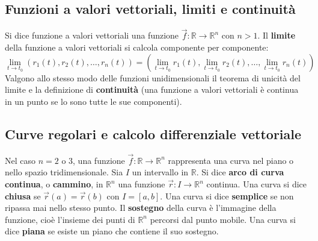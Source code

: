 \subsection{Funzioni a valori vettoriali, limiti e continuità}
Si dice funzione a valori vettoriali una funzione $\vec{f} : \mathbb{R} \rightarrow  \mathbb{R}^n$ con $n > 1$.\newline
\newline
Il \textbf{limite} della funzione a valori vettoriali si calcola componente per componente:
\[
    \lim_{t\rightarrow t_0}(r_1(t), r_2(t), \dots, r_n(t)) = \left(\lim_{t\rightarrow t_0}r_1(t), \lim_{t\rightarrow t_0}r_2(t), \dots, \lim_{t\rightarrow t_0}r_n(t)\right)
\]
Valgono allo stesso modo delle funzioni unidimensionali il teorema di unicità del limite e la definizione di \textbf{continuità} (una funzione a valori vettoriali è continua in un punto se lo sono tutte le sue componenti).\newline
\subsection{Curve regolari e calcolo differenziale vettoriale}
Nel caso $n = 2$ o $3$, una funzione $\vec{f} : \mathbb{R} \rightarrow  \mathbb{R}^n$ rappresenta una curva nel piano o nello spazio tridimensionale.\newline
\newline
Sia $I$ un intervallo in $\mathbb{R}$. Si dice \textbf{arco di curva continua}, o \textbf{cammino}, in $\mathbb{R}^n$ una funzione $\vec{r}: I \rightarrow \mathbb{R}^n$ continua.\newline
\newline
Una curva si dice \textbf{chiusa} se $\vec{r}(a) = \vec{r}(b)$ con $I=[a,b]$.\newline
\newline
Una curva si dice \textbf{semplice} se non ripassa mai nello stesso punto.\newline
\newline
Il \textbf{sostegno} della curva è l'immagine della funzione, cioè l'insieme dei punti di $\mathbb{R}^n$ percorsi dal punto mobile.\newline
\newline
Una curva si dice \textbf{piana} se esiste un piano che contiene il suo sostegno.
